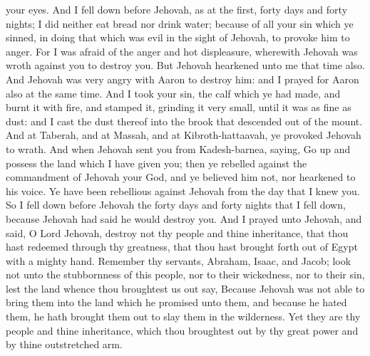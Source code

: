 your eyes. And I fell down before Jehovah, as at the first, forty days and forty nights; I did neither eat bread nor drink water; because of all your sin which ye sinned, in doing that which was evil in the sight of Jehovah, to provoke him to anger. For I was afraid of the anger and hot displeasure, wherewith Jehovah was wroth against you to destroy you. But Jehovah hearkened unto me that time also. And Jehovah was very angry with Aaron to destroy him: and I prayed for Aaron also at the same time. And I took your sin, the calf which ye had made, and burnt it with fire, and stamped it, grinding it very small, until it was as fine as dust: and I cast the dust thereof into the brook that descended out of the mount.  And at Taberah, and at Massah, and at Kibroth-hattaavah, ye provoked Jehovah to wrath. And when Jehovah sent you from Kadesh-barnea, saying, Go up and possess the land which I have given you; then ye rebelled against the commandment of Jehovah your God, and ye believed him not, nor hearkened to his voice. Ye have been rebellious against Jehovah from the day that I knew you.  So I fell down before Jehovah the forty days and forty nights that I fell down, because Jehovah had said he would destroy you. And I prayed unto Jehovah, and said, O Lord Jehovah, destroy not thy people and thine inheritance, that thou hast redeemed through thy greatness, that thou hast brought forth out of Egypt with a mighty hand. Remember thy servants, Abraham, Isaac, and Jacob; look not unto the stubbornness of this people, nor to their wickedness, nor to their sin, lest the land whence thou broughtest us out say, Because Jehovah was not able to bring them into the land which he promised unto them, and because he hated them, he hath brought them out to slay them in the wilderness. Yet they are thy people and thine inheritance, which thou broughtest out by thy great power and by thine outstretched arm. 

